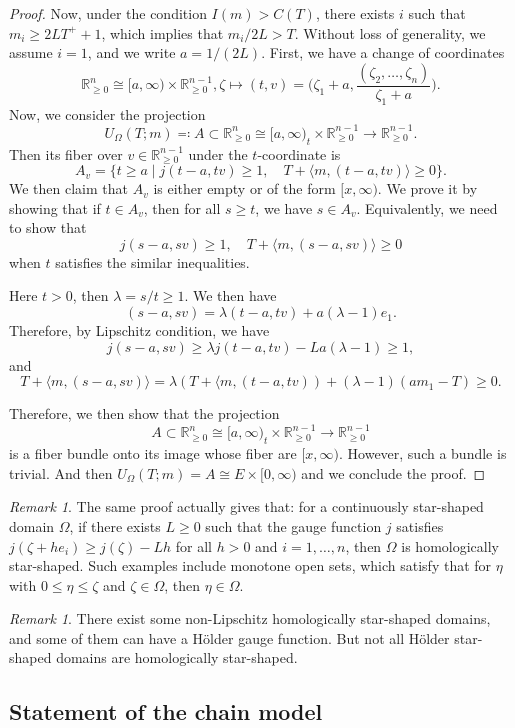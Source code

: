 \documentclass[11pt]{amsart}
\numberwithin{equation}{section}
\theoremstyle{plain}
\theoremstyle{definition}
\theoremstyle{remark}
\newtheorem{RMK}[rmk]{Remark}
\newcommand{\bR} { {\mathbb{R}}}
\begin{document}
\begin{proof}
Now, under the condition $I(m)>C(T)$, there exists $i$ such that $m_i\geq 2LT^++1$, which implies that $m_i/2L>T$. Without loss of generality, we assume $i=1$, and we write $a=1/(2L)$. First, we have a change of coordinates
\[\bR^n_{\geq0} \cong [a,\infty)\times\bR^{n-1}_{\geq0} , \zeta\mapsto (t,v)=\Big(\zeta_1+a,\frac{(\zeta_2,\dots,\zeta_n)}{\zeta_1+a}\Big).\]
Now, we consider the projection
\[U_\Omega(T;m)\eqqcolon A\subset \bR^n_{\geq0} \cong [a,\infty)_t\times\bR^{n-1}_{\geq0} \to\bR^{n-1}_{\geq0}.  \]
Then its fiber over $v\in \bR^{n-1}_{\geq0}$ under the $t$-coordinate is
\[A_v=\{t\geq a\mid j(t-a,tv)\geq 1,\quad T+\langle m,(t-a,tv)\rangle \geq 0\}.\]
We then claim that $A_v$ is either empty or of the form $[x,\infty)$. We prove it by showing that if $t\in A_v$, then for all $s\geq t$, we have $s\in A_v$. Equivalently, we need to show that
\[j(s-a,sv)\geq 1,\quad T+\langle m,(s-a,sv)\rangle \geq 0\]
when $t$ satisfies the similar inequalities. 

Here $t>0$, then $\lambda=s/t\geq 1$. We then have
\[(s-a,sv)=\lambda(t-a,tv)+a(\lambda-1)e_1.\]
Therefore, by Lipschitz condition, we have
\[j(s-a,sv)\geq \lambda j(t-a,tv)-La(\lambda-1)\geq 1,\]
and
\[T+\langle m,(s-a,sv)\rangle = \lambda(T+\langle m,(t-a,tv))+(\lambda-1)(am_1-T)\geq 0.\]

Therefore, we then show that the projection
\[A\subset \bR^n_{\geq0} \cong [a,\infty)_t\times\bR^{n-1}_{\geq0} \to\bR^{n-1}_{\geq0}\]
is a fiber bundle onto its image whose fiber are $[x,\infty)$. However, such a bundle is trivial. And then $U_\Omega(T;m)=A\cong E \times [0,\infty)$ and we conclude the proof.
\end{proof}
\begin{RMK}The same proof actually gives that: for a continuously star-shaped domain $\Omega$, if there exists $L\geq 0$ such that the gauge function $j$ satisfies $j(\zeta+he_i)\geq j(\zeta)-Lh$ for all $h>0$ and $i=1,\dots,n$, then $\Omega$ is homologically star-shaped. Such examples include monotone open sets, which satisfy that for $\eta$ with $0\leq \eta\leq \zeta$ and $\zeta\in \Omega$, then $\eta\in \Omega$.    
\end{RMK}
\begin{RMK}
    There exist some non-Lipschitz homologically star-shaped domains, and some of them can have a Hölder gauge function. But not all Hölder star-shaped domains are homologically star-shaped.
\end{RMK}
 


\subsection{Statement of the chain model}\label{section: chain model statement}
\end{document}
